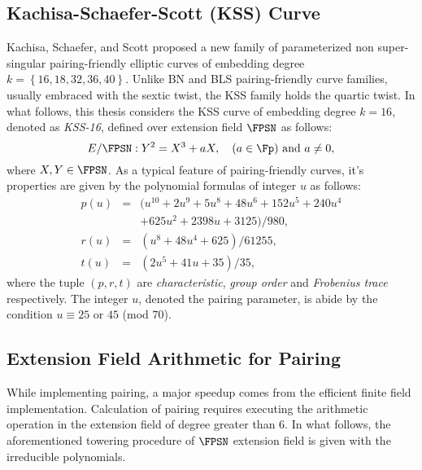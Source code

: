 \subsection{Kachisa-Schaefer-Scott (KSS) Curve \cite{EPRINT:KacSchSco07}}
Kachisa, Schaefer, and Scott proposed a new family of  parameterized non super-singular pairing-friendly elliptic curves of embedding degree $k = \left\lbrace 16, 18, 32, 36, 40\right\rbrace$.
Unlike BN and BLS pairing-friendly curve families, usually embraced with the sextic twist, the KSS family  holds the quartic twist. 
In what follows, this thesis considers  the KSS curve of embedding degree $k =16$, denoted as \textit{KSS-16}, defined over extension field $\FPSN$ as follows:
\begin{equation}\label{eq:KSS_16}
E/\FPSN:Y^2=X^3+aX, \quad \mbox{($a \in \Fp$) and  $a \neq 0$},
\end{equation}
where $X,Y \in \FPSN$. 
As a typical feature of pairing-friendly curves, it's properties are given by the polynomial formulas of integer $u$ as follows:
\begin{subequations}
	\begin{eqnarray}
	p(u) &= & (u^{10} +2u^9 +5u^8 +48u^6 +152u^5 +240u^4   \nonumber \\ 
	&& +625u^2 +2398u +3125)/980,  \\\label{eq:kss_16_char}
	r(u) &= & (u^8 +48u^4 +625)/61255, \label{eq:kss_16_degree}  \\
	t(u) &=& (2u^5 +41u+35)/35, \label{eq:kss_16_trace} 
	\end{eqnarray}
\end{subequations} 
where the tuple $(p,r,t)$ are \textit{characteristic}, \textit{group order} and \textit{Frobenius trace} respectively.
The integer  $u$, denoted the pairing parameter, is abide by the condition $u \equiv 25$ or $45$ (mod $70$). 

\subsection{Extension Field Arithmetic for Pairing}
While implementing pairing, a major speedup comes from the efficient finite field implementation. 
Calculation of pairing requires executing the arithmetic operation in the extension field {of degree greater than 6}\cite{EPRINT:BenSco09}.
In what follows, the aforementioned towering procedure of  $\FPSN$ extension field is given with the irreducible polynomials.


